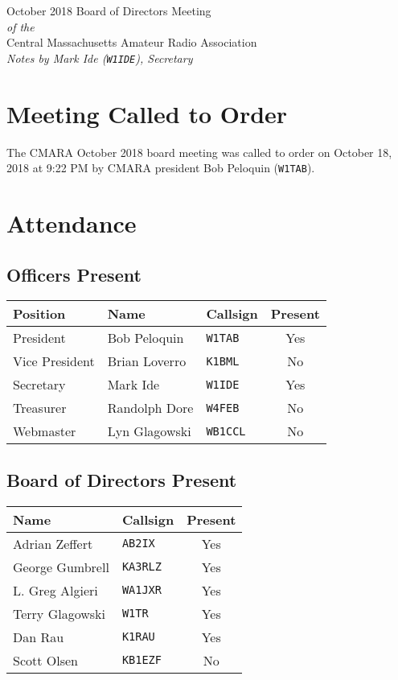 \documentclass[10pt,letterpaper]{article}
\begin{document}
\begin{center}
{\huge October 2018 Board of Directors Meeting}\\
\emph{of the}\\
{\Large Central Massachusetts Amateur Radio Association}\\
\emph{Notes by Mark Ide (\texttt{W1IDE}), Secretary}
\end{center}

\section{Meeting Called to Order}
The CMARA October 2018 board meeting was called to order on October 18, 2018 at 9:22 PM by CMARA president Bob Peloquin (\texttt{W1TAB}).

\section{Attendance}

\subsection{Officers Present}
\begin{tabular}{|l|l|l|c|}
  \hline
  \textbf{Position} & \textbf{Name}  & \textbf{Callsign} & \textbf{Present} \\ \hline
  President         & Bob Peloquin   & \texttt{W1TAB}    & Yes \\
  Vice President    & Brian Loverro  & \texttt{K1BML}    & No  \\
  Secretary         & Mark Ide       & \texttt{W1IDE}    & Yes \\
  Treasurer         & Randolph Dore  & \texttt{W4FEB}    & No  \\
  Webmaster         & Lyn Glagowski  & \texttt{WB1CCL}   & No  \\
  \hline
\end{tabular}

\subsection{Board of Directors Present}
\begin{tabular}{|l|l|c|}
  \hline
  \textbf{Name}   & \textbf{Callsign} & \textbf{Present} \\ \hline
  Adrian Zeffert  & \texttt{AB2IX}    &  Yes \\ \hline
  George Gumbrell & \texttt{KA3RLZ}   &  Yes \\ \hline
  L. Greg Algieri & \texttt{WA1JXR}   &  Yes \\ \hline
  Terry Glagowski & \texttt{W1TR}     &  Yes \\ \hline
  Dan Rau         & \texttt{K1RAU}    &  Yes \\ \hline
  Scott Olsen     & \texttt{KB1EZF}   &  No  \\ \hline
\end{tabular}\\
\end{document}
